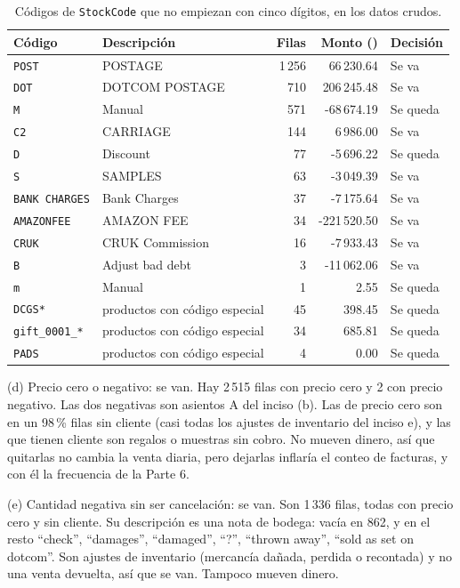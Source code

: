 \documentclass[11pt]{article}
\begin{document}
\begin{table}[H]
\centering
\caption{Códigos de \texttt{StockCode} que no empiezan con cinco dígitos, en los datos crudos.}\label{tab:codigos}
\small
\begin{tabular}{|l|l|r|r|l|}
\hline
Código & Descripción & Filas & Monto (\textsterling{}) & Decisión \\
\hline
\texttt{POST} & POSTAGE & 1\,256 & 66\,230.64 & Se va \\
\texttt{DOT} & DOTCOM POSTAGE & 710 & 206\,245.48 & Se va \\
\texttt{M} & Manual & 571 & -68\,674.19 & Se queda \\
\texttt{C2} & CARRIAGE & 144 & 6\,986.00 & Se va \\
\texttt{D} & Discount & 77 & -5\,696.22 & Se queda \\
\texttt{S} & SAMPLES & 63 & -3\,049.39 & Se va \\
\texttt{BANK CHARGES} & Bank Charges & 37 & -7\,175.64 & Se va \\
\texttt{AMAZONFEE} & AMAZON FEE & 34 & -221\,520.50 & Se va \\
\texttt{CRUK} & CRUK Commission & 16 & -7\,933.43 & Se va \\
\texttt{B} & Adjust bad debt & 3 & -11\,062.06 & Se va \\
\texttt{m} & Manual & 1 & 2.55 & Se queda \\
\texttt{DCGS*} & productos con código especial & 45 & 398.45 & Se queda \\
\texttt{gift\_0001\_*} & productos con código especial & 34 & 685.81 & Se queda \\
\texttt{PADS} & productos con código especial & 4 & 0.00 & Se queda \\
\hline
\end{tabular}
\end{table}

(d) Precio cero o negativo: se van. Hay 2\,515 filas con precio cero y 2 con precio
negativo. Las dos negativas son asientos A del inciso (b). Las de precio cero son en un 98\,\%
filas sin cliente (casi todas los ajustes de inventario del inciso e), y las que tienen
cliente son regalos o muestras sin cobro. No mueven dinero, así que quitarlas no cambia la venta
diaria, pero dejarlas inflaría el conteo de facturas, y con él la frecuencia de la Parte 6.

(e) Cantidad negativa sin ser cancelación: se van. Son 1\,336 filas, todas con precio
cero y sin cliente. Su descripción es una nota de bodega: vacía en 862, y en el resto
``check'', ``damages'', ``damaged'', ``?'', ``thrown away'', ``sold as set on dotcom''. Son ajustes
de inventario (mercancía dañada, perdida o recontada) y no una venta devuelta, así que se van.
Tampoco mueven dinero.
\end{document}
